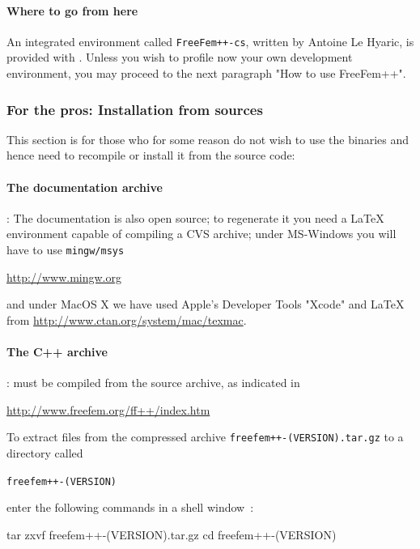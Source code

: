 \documentclass[a4paper,twoside,12pt]{book}
\begin{document}
\paragraph{Where to go from here} An integrated environment called \texttt{FreeFem++-cs}, written by Antoine Le Hyaric,  is provided with \freefempp. Unless you wish to profile now your own development environment, you may proceed to  the next paragraph "How to use FreeFem++".

\subsubsection{For the pros: Installation from sources}

This section is for those who for some reason do not wish to use the binaries and hence need to recompile \freefempp or install it from the source code:

\paragraph{The documentation archive}: The documentation is also open source; to regenerate it you need a \LaTeX{} environment capable of compiling a CVS archive; under MS-Windows you will have to use  \texttt{mingw/msys}
\begin{center}
   \url{http://www.mingw.org}
\end{center}
 and under MacOS X we have used Apple's Developer Tools "Xcode" and  \LaTeX{ } from \url{http://www.ctan.org/system/mac/texmac}.

\paragraph{The C++  archive}:  \freefempp must be compiled  from the source archive, as indicated in \begin{center}
   \url{http://www.freefem.org/ff++/index.htm}
\end{center}
To
extract files from the compressed archive \texttt{freefem++-(VERSION).tar.gz}
to a directory called
\begin{center}
\texttt{freefem++-(VERSION)}
\end{center}
enter the following commands in a shell window~:

\bFF
tar zxvf freefem++-(VERSION).tar.gz
cd freefem++-(VERSION)
\eFF
\end{document}
